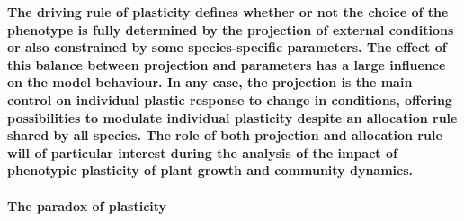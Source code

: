 \textbf{The driving rule of plasticity defines whether or not the choice of the phenotype is fully determined by the projection of external conditions or also constrained by some species-specific parameters. The effect of this balance between projection and parameters has a large influence on the model behaviour. In any case, the projection is the main control on individual plastic response to change in conditions, offering possibilities to modulate individual plasticity despite an allocation rule shared by all species. The role of both projection and allocation rule will of particular interest during the analysis of the impact of phenotypic plasticity of plant growth and community dynamics.}

\paragraph{The paradox of plasticity}

